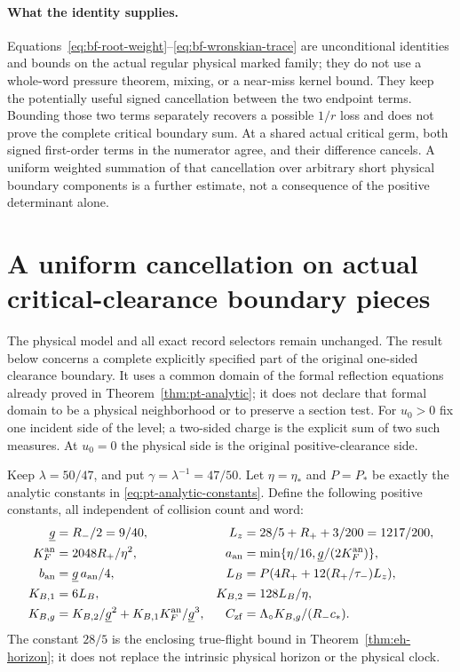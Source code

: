 \paragraph{What the identity supplies.}
Equations~\eqref{eq:bf-root-weight}--\eqref{eq:bf-wronskian-trace}
are unconditional identities and bounds on the actual regular
physical marked family; they do not use a whole-word pressure
theorem, mixing, or a near-miss kernel bound.  They keep the
potentially useful signed cancellation between the two endpoint
terms.  Bounding those two terms separately recovers a possible
$1/r$ loss and does not prove the complete critical boundary sum.
At a shared actual critical germ, both signed first-order terms in
the numerator agree, and their difference cancels.  A uniform
weighted summation of that cancellation over arbitrary short
physical boundary components is a further estimate, not a
consequence of the positive determinant alone.


\section{A uniform cancellation on actual critical-clearance boundary pieces}
\label{sec:zf-zero-offset}

The physical model and all exact record selectors remain unchanged.
The result below concerns a complete explicitly specified part of the
original one-sided clearance boundary.  It uses a common domain of
the formal reflection equations already proved in
Theorem~\ref{thm:pt-analytic}; it does not declare that formal domain
to be a physical neighborhood or to preserve a section test.
For $u_0>0$ fix one incident side of the level; a two-sided charge
is the explicit sum of two such measures.  At $u_0=0$ the physical
side is the original positive-clearance side.

Keep $\lambda=50/47$, and put $\gamma=\lambda^{-1}=47/50$.
Let $\eta=\eta_*$ and $P=P_*$ be exactly the analytic constants in
\eqref{eq:pt-analytic-constants}.  Define the following positive
constants, all independent of collision count and word:
\begin{align}
 \underline g&=R_-/2=9/40,&
 L_z&=28/5+R_++3/200=1217/200,\notag\\
 K_F^{\rm an}&=2048R_+/\eta^2,&
 a_{\rm an}&=\min\{\eta/16,\underline g/(2K_F^{\rm an})\},
                                                     \label{eq:zf-constants}\\
 b_{\rm an}&=\underline g\,a_{\rm an}/4,&
 L_B&=P(4R_++12(R_+/\tau_-)L_z),\notag\\
 K_{B,1}&=6L_B,&K_{B,2}&=128L_B/\eta,\notag\\
 K_{B,g}&=K_{B,2}/\underline g^2
             +K_{B,1}K_F^{\rm an}/\underline g^3,&
 C_{\rm zf}&=\Lambda_\circ K_{B,g}/(R_-c_*).
                                                     \label{eq:zf-final-constant}
\end{align}
The constant $28/5$ is the enclosing true-flight bound in
Theorem~\ref{thm:eh-horizon}; it does not replace the intrinsic
physical horizon or the physical clock.

